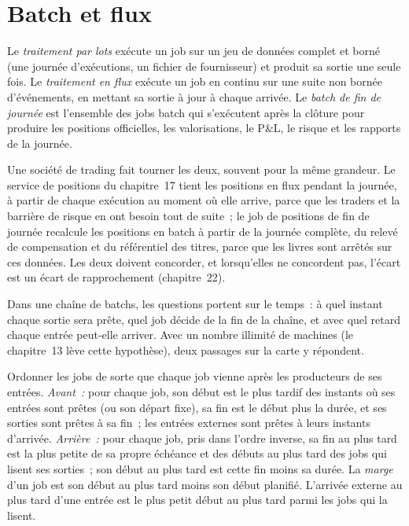 \section{Batch et flux}

\begin{definition}\label{def:pl:the-platform-map:batch}
Le \emph{traitement par lots} exécute un job sur un jeu de données complet et borné (une journée d'exécutions, un fichier de fournisseur) et
produit sa sortie une seule fois. Le \emph{traitement en flux} exécute un job en continu sur une suite non bornée
d'événements, en mettant sa sortie à jour à chaque arrivée. Le \emph{batch de fin de journée} est l'ensemble des jobs
batch qui s'exécutent après la clôture pour produire les positions officielles, les valorisations, le P\&L, le risque et les rapports de la journée.
\end{definition}

Une société de trading fait tourner les deux, souvent pour la même grandeur. Le service de positions du chapitre~17 tient les positions en flux pendant
la journée, à partir de chaque exécution au moment où elle arrive, parce que les traders et la barrière de risque en ont besoin tout de suite~; le job de positions de fin de journée recalcule
les positions en batch à partir de la journée complète, du relevé de compensation et du référentiel des titres, parce que les livres sont arrêtés sur ces données.
Les deux doivent concorder, et lorsqu'elles ne concordent pas, l'écart est un écart de rapprochement (chapitre~22).

Dans une chaîne de batchs, les questions portent sur le temps~: à quel instant chaque sortie sera prête, quel job décide de la fin de la chaîne, et avec quel
retard chaque entrée peut-elle arriver. Avec un nombre illimité de machines (le chapitre~13 lève cette hypothèse), deux passages sur la carte y répondent.

\begin{method}\label{met:pl:the-platform-map:passes}
Ordonner les jobs de sorte que chaque job vienne après les producteurs de ses entrées.
\emph{Avant~:} pour chaque job, son début est le plus tardif des instants où ses entrées sont prêtes (ou son départ fixe), sa fin est le début plus
la durée, et ses sorties sont prêtes à sa fin~; les entrées externes sont prêtes à leurs instants d'arrivée.
\emph{Arrière~:} pour chaque job, pris dans l'ordre inverse, sa fin au plus tard est la plus petite de sa propre échéance et des débuts au plus tard des
jobs qui lisent ses sorties~; son début au plus tard est cette fin moins sa durée. La \emph{marge} d'un job est son début au plus tard moins son
début planifié. L'arrivée externe au plus tard d'une entrée est le plus petit début au plus tard parmi les jobs qui la lisent.
\end{method}

